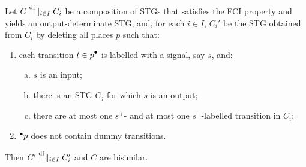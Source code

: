 \begin{proposition}\label{pr-main}
Let $C\stackrel{\mathrm{df}}{=}\parallel_{i\in I}C_{i}$ be a composition of STGs
that satisfies the FCI property and yields an
output-determinate STG, and, for each $i\in I$, $C_{i}'$ be the
STG obtained from $C_{i}$ by deleting all places $p$ such that:
\begin{enumerate}[1.]
\item each transition $t\in\post{p}$ is labelled with a
    signal, say $s$, and:
\begin{enumerate}[a)]
\item\label{only-inputs-in-postset} $s$ is an input;
\item\label{exists-matching-output} there is an STG $C_j$ for which $s$ is an output;
\item\label{injective-labelling} there are at most one
    $s^+$- and at most one $s^-$-la\-bel\-led
    transition in $C_i$;
\end{enumerate}
\item\label{no-dummies-in-preset} ${}^\bullet {p}$ does not
    contain dummy transitions.
\end{enumerate}
Then $C'\stackrel{\mathrm{df}}{=}\parallel_{i\in I}C_i'$ and $C$ are bisimilar.
\end{proposition}

